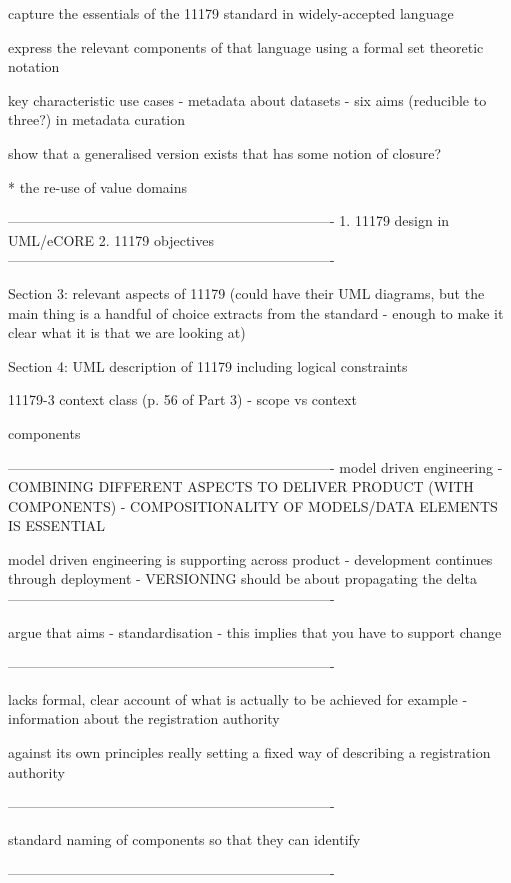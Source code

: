 capture the essentials of the 11179 standard in widely-accepted
language

express the relevant components of that language using a formal set
theoretic notation

key characteristic use cases 
 - metadata about datasets
 - six aims (reducible to three?) in metadata curation 

show that a generalised version exists that has some notion of
closure? 

 * the re-use of value domains 

----------------------------------------------------------------------
1. 11179 design in UML/eCORE
2. 11179 objectives 
----------------------------------------------------------------------


Section 3: relevant aspects of 11179 (could have their UML diagrams,
but the main thing is a handful of choice extracts from the standard -
enough to make it clear what it is that we are looking at)

Section 4: UML description of 11179 including logical constraints 
 
11179-3 context class (p. 56 of Part 3) - scope vs context 

components 

----------------------------------------------------------------------
model driven engineering
 - COMBINING DIFFERENT ASPECTS TO DELIVER PRODUCT (WITH COMPONENTS)
 - COMPOSITIONALITY OF MODELS/DATA ELEMENTS IS ESSENTIAL 

model driven engineering is supporting across product 
 - development continues through deployment 
 - VERSIONING should be about propagating the delta 
----------------------------------------------------------------------

argue that aims - standardisation - this implies that you have to
support change 

----------------------------------------------------------------------

lacks formal, clear account of what is actually to be achieved 
for example - information about the registration authority 

against its own principles really
setting a fixed way of describing a registration authority 

----------------------------------------------------------------------

standard naming of components so that they can identify 

----------------------------------------------------------------------

